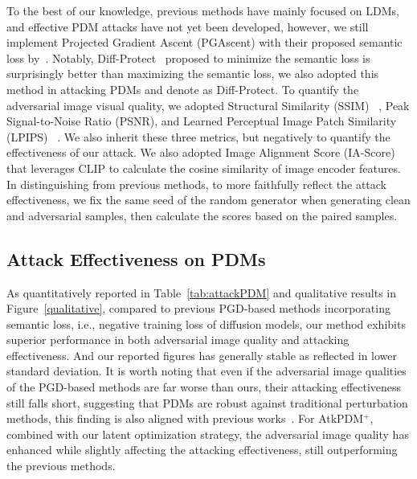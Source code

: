 To the best of our knowledge, previous methods have mainly focused on LDMs, and effective PDM attacks have not yet been developed, however, we still implement Projected Gradient Ascent (PGAscent) with their proposed semantic loss by~\cite{salman2023raisingcostmaliciousaipowered, liang2023adversarialexampledoesgood, liang2023mistimprovedadversarialexamples, xue2024effectiveprotectiondiffusionbased}. Notably, Diff-Protect~\cite{xue2024effectiveprotectiondiffusionbased} proposed to minimize the semantic loss is surprisingly better than maximizing the semantic loss, we also adopted this method in attacking PDMs and denote as Diff-Protect. To quantify the adversarial image visual quality, we adopted Structural Similarity (SSIM) ~\cite{wang2004image}, Peak Signal-to-Noise Ratio (PSNR), and Learned Perceptual Image Patch Similarity (LPIPS) ~\cite{zhang2018unreasonable}. We also inherit these three metrics, but negatively to quantify the effectiveness of our attack. We also adopted Image Alignment Score (IA-Score) \cite{kumari2023multi} that leverages CLIP \cite{radford2021learning} to calculate the cosine similarity of image encoder features. In distinguishing from previous methods, to more faithfully reflect the attack effectiveness, we fix the same seed of the random generator when generating clean and adversarial samples, then calculate the scores based on the paired samples.

\subsection{Attack Effectiveness on PDMs}

As quantitatively reported in Table~\ref{tab:attackPDM} and qualitative results in Figure~\ref{qualitative}, compared to previous PGD-based methods incorporating semantic loss, i.e., negative training loss of diffusion models, our method exhibits superior performance in both adversarial image quality and attacking effectiveness. And our reported figures has generally stable as reflected in lower standard deviation. It is worth noting that even if the adversarial image qualities of the PGD-based methods are far worse than ours, their attacking effectiveness still falls short, suggesting that PDMs are robust against traditional perturbation methods, this finding is also aligned with previous works~\cite{xue2024effectiveprotectiondiffusionbased,xue2024pixelbarrierdiffusionmodels}. For AtkPDM$^+$, combined with our latent optimization strategy, the adversarial image quality has enhanced while slightly affecting the attacking effectiveness, still outperforming the previous methods.


